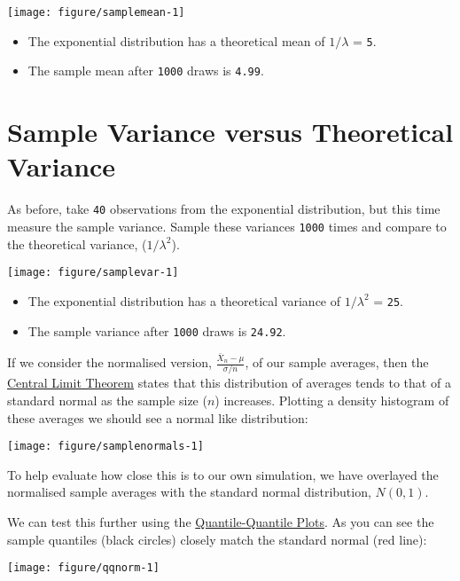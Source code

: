 \documentclass[legalpaper]{article}
\begin{document}
\begin{center}\texttt{[image: figure/samplemean-1]} \end{center}

\begin{itemize}
\itemsep1pt\parskip0pt
\item
  The exponential distribution has a theoretical mean of \(1/\lambda\) =
  \texttt{5}.
\item
  The sample mean after \texttt{1000} draws is \texttt{4.99}.
\end{itemize}

\section{Sample Variance versus Theoretical
Variance}\label{sample-variance-versus-theoretical-variance}

As before, take \texttt{40} observations from the exponential
distribution, but this time measure the sample variance. Sample these
variances \texttt{1000} times and compare to the theoretical variance,
(\(1/\lambda^2\)).

\begin{center}\texttt{[image: figure/samplevar-1]} \end{center}

\begin{itemize}
\itemsep1pt\parskip0pt
\item
  The exponential distribution has a theoretical variance of
  \(1/\lambda^2\) = \texttt{25}.
\item
  The sample variance after \texttt{1000} draws is \texttt{24.92}.
\end{itemize}


If we consider the normalised version,
\(\frac {\bar X_n - \mu} {\sigma / n}\), of our sample averages, then
the \href{https://en.wikipedia.org/wiki/Central_limit_theorem}{Central
Limit Theorem} states that this distribution of averages tends to that
of a standard normal as the sample size (\(n\)) increases. Plotting a
density histogram of these averages we should see a normal like
distribution:

\begin{center}\texttt{[image: figure/samplenormals-1]} \end{center}

To help evaluate how close this is to our own simulation, we have
overlayed the normalised sample averages with the standard normal
distribution, \(N(0,1)\).

We can test this further using the
\href{https://stat.ethz.ch/R-manual/R-devel/library/stats/html/qqnorm.html}{Quantile-Quantile
Plots}. As you can see the sample quantiles (black circles) closely
match the standard normal (red line):

\begin{center}\texttt{[image: figure/qqnorm-1]} \end{center}
\end{document}
